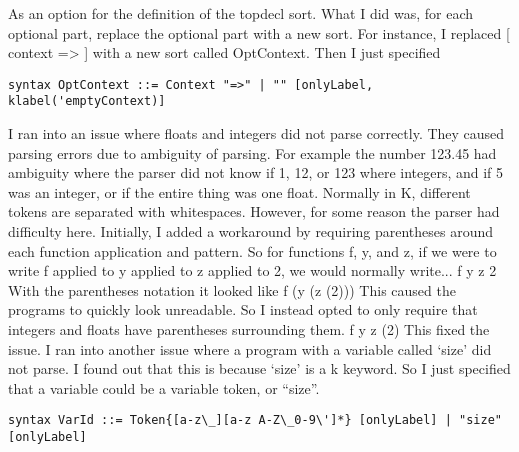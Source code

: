 As an option for the definition of the topdecl sort. What I did was, for each optional part, replace the optional part with a new sort. For instance, I replaced [ context => ] with a new sort called OptContext. Then I just specified
\begin{lstlisting}
syntax OptContext ::= Context "=>" | "" [onlyLabel, klabel('emptyContext)]
\end{lstlisting}
I ran into an issue where floats and integers did not parse correctly. They caused parsing errors due to ambiguity of parsing. For example the number 123.45 had ambiguity where the parser did not know if 1, 12, or 123 where integers, and if 5 was an integer, or if the entire thing was one float. Normally in K, different tokens are separated with whitespaces. However, for some reason the parser had difficulty here. Initially, I added a workaround by requiring parentheses around each function application and pattern. So for functions f, y, and z, if we were to write f applied to y applied to z applied to 2, we would normally write...
f y z 2
With the parentheses notation it looked like
f (y (z (2)))
This caused the programs to quickly look unreadable. So I instead opted to only require that integers and floats have parentheses surrounding them.
f y z (2)
This fixed the issue.
I ran into another issue where a program with a variable called ‘size’ did not parse. I found out that this is because ‘size’ is a k keyword. So I just specified that a variable could be a variable token, or “size”.
\begin{lstlisting}
syntax VarId ::= Token{[a-z\_][a-z A-Z\_0-9\']*} [onlyLabel] | "size" [onlyLabel]
\end{lstlisting}